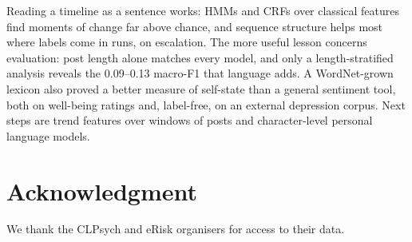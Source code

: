\documentclass[conference]{IEEEtran}
\begin{document}
Reading a timeline as a sentence works: HMMs and CRFs over classical features find moments of change far above chance, and sequence structure helps most where labels come in runs, on escalation. The more useful lesson concerns evaluation: post length alone matches every model, and only a length-stratified analysis reveals the 0.09--0.13 macro-F1 that language adds. A WordNet-grown lexicon also proved a better measure of self-state than a general sentiment tool, both on well-being ratings and, label-free, on an external depression corpus. Next steps are trend features over windows of posts and character-level personal language models.

\section*{Acknowledgment}
We thank the CLPsych and eRisk organisers for access to their data.



\end{document}
